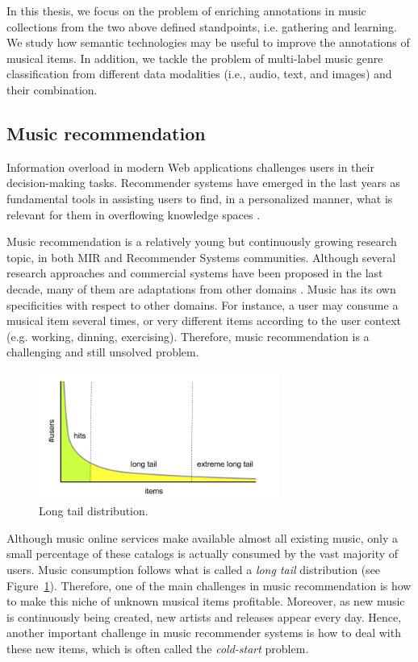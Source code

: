 In this thesis, we focus on the problem of enriching annotations in music collections from the two above defined standpoints, i.e. gathering and learning. We study how semantic technologies may be useful to improve the annotations of musical items. In addition, we tackle the problem of multi-label music genre classification from different data modalities (i.e., audio, text, and images) and their combination.


\subsection{Music recommendation}
\label{sec:intro:recommendation}

Information overload in modern Web applications challenges users in their decision-making tasks. Recommender systems have emerged in the last years as fundamental tools in assisting users to find, in a personalized manner, what is relevant for them in overflowing knowledge spaces \cite{ricci2011introduction}. 

Music recommendation is a relatively young but continuously growing research topic, in both MIR and Recommender Systems communities. Although several research approaches and commercial systems have been proposed in the last decade, many of them are adaptations from other domains \citep{oscarBook}. 
Music has its own specificities with respect to other domains. For instance, a user may consume a musical item several times, or very different items according to the user context (e.g. working, dinning, exercising). Therefore, music recommendation is a challenging and still unsolved problem.

\begin{figure}
	\centering
	\includegraphics[width=0.7\textwidth]{ch01_introduction_pics/Long_tail.png}
	\caption{Long tail distribution.\label{fig:soa:longtail}}
\end{figure}

Although music online services make available almost all existing music, only a small percentage of these catalogs is actually consumed by the vast majority of users. Music consumption follows what is called a \textit{long tail} distribution \citep{oscarBook} (see Figure~\ref{fig:soa:longtail}). Therefore, one of the main challenges in music recommendation is how to make this niche of unknown musical items profitable. Moreover, as new music is continuously being created, new artists and releases appear every day. Hence, another important challenge in music recommender systems is how to deal with these new items, which is often called the \textit{cold-start} problem. %

